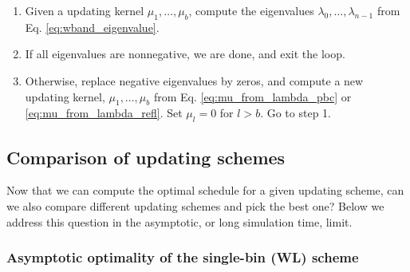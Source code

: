 \documentclass[reprint, floatfix]{revtex4-1}
\begin{document}
%
\begin{enumerate}
  \item
    Given a updating kernel $\mu_1, \dots, \mu_b$,
    compute the eigenvalues
    $\lambda_0, \dots, \lambda_{n-1}$
	from Eq. \eqref{eq:wband_eigenvalue}.
  \item
    If all eigenvalues are nonnegative,
    we are done, and exit the loop.
  \item
    Otherwise, replace negative eigenvalues by zeros,
    and compute a new updating kernel,
    $\mu_1, \dots, \mu_b$ from
    Eq. \eqref{eq:mu_from_lambda_pbc}
    or
    \eqref{eq:mu_from_lambda_refl}.
    Set $\mu_l = 0$ for $l > b$.
    Go to step 1.
\end{enumerate}



\subsection{\label{sec:cmpschemes}
Comparison of updating schemes}


Now that we can compute the optimal schedule
for a given updating scheme,
can we also compare different updating schemes
and pick the best one?
%
Below we address this question
in the asymptotic, or long simulation time,
limit.


\subsubsection{\label{sec:optWL}
Asymptotic optimality of the single-bin (WL) scheme}
\end{document}

